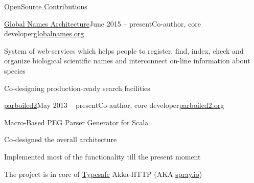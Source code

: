 \documentclass{resume} %
\begin{document}
\begin{rSection}{\href{https://github.com/alexander-myltsev?tab=repositories}{OpenSource Contributions}}

\begin{samepage}
\begin{rSubsection}{\href{https://github.com/GlobalNamesArchitecture/}{Global
Names Architecture}}{June 2015 -- present}{Co-author, core
developer}{\href{http://globalnames.org/}{globalnames.org}}
\item System of web-services which helps people to register, find, index, check and organize biological scientific names and interconnect on-line information about species
\item Co-designing production-ready search facilities
\end{rSubsection}
\end{samepage}

\begin{samepage}
\begin{rSubsection}{\href{http://parboiled2.org}{parboiled2}}{May 2013 -- present}{Co-author, core developer}{\href{http://parboiled2.org}{parboiled2.org}}
\item Macro-Based PEG Parser Generator for Scala
\item Co-designed the overall architecture
\item Implemented most of the functionality till the present moment
\item The project is in core of \href{http://typesafe.com}{Typesafe} Akka-HTTP (AKA \href{http://spray.io}{spray.io})
\end{rSubsection}
\end{samepage}

\begin{comment}
\begin{samepage}
\begin{rSubsection}{\href{http://russianaicup.ru/}{RussianAI Cup}}{September 2014 -- October 2014}{Core contributor to Scala package}{\href{http://github.com/iSerge/scala-cgdk}{github.com/iSerge/scala-cgdk}}
\item public post about package: \href{http://russianaicup.ru/post/20}{http://russianaicup.ru/post/20}
\end{rSubsection}
\end{samepage}

\begin{samepage}
\begin{rSubsection}{\href{http://github.com/alexander-myltsev/RSlick}{RSlick}}{}{Author}{\href{http://github.com/alexander-myltsev/RSlick}{github.com/alexander-myltsev/RSlick}}
\item R-package for templating and unified access to relational databases
\end{rSubsection}
\end{samepage}


\end{comment}
\end{rSection}
\end{document}
